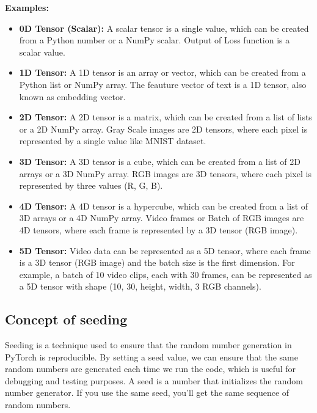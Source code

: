 \documentclass[12pt, a4paper]{article}
\begin{document}
\vspace{0.5em}

\textbf{Examples:}
\begin{itemize}[itemsep=0.1em]
    \item \textbf{0D Tensor (Scalar):} A scalar tensor is a single value, which can be created from a Python number or a NumPy scalar. Output of Loss function is a scalar value.
    \item \textbf{1D Tensor:} A 1D tensor is an array or vector, which can be created from a Python list or NumPy array. The feauture vector of text is a 1D tensor, also known as embedding vector.
    \item \textbf{2D Tensor:} A 2D tensor is a matrix, which can be created from a list of lists or a 2D NumPy array. Gray Scale images are 2D tensors, where each pixel is represented by a single value like MNIST dataset.
    \item \textbf{3D Tensor:} A 3D tensor is a cube, which can be created from a list of 2D arrays or a 3D NumPy array. RGB images are 3D tensors, where each pixel is represented by three values (R, G, B).
    \item \textbf{4D Tensor:} A 4D tensor is a hypercube, which can be created from a list of 3D arrays or a 4D NumPy array. Video frames or Batch of RGB images are 4D tensors, where each frame is represented by a 3D tensor (RGB image).
    \item \textbf{5D Tensor:} Video data can be represented as a 5D tensor, where each frame is a 3D tensor (RGB image) and the batch size is the first dimension. For example, a batch of 10 video clips, each with 30 frames, can be represented as a 5D tensor with shape (10, 30, height, width, 3 RGB channels).
\end{itemize}

\subsection{Concept of seeding}

Seeding is a technique used to ensure that the random number generation in PyTorch is reproducible. By setting a seed value, we can ensure that the same random numbers are generated each time we run the code, which is useful for debugging and testing purposes.
A seed is a number that initializes the random number generator. If you use the same seed, you'll get the same sequence of random numbers.
\end{document}
